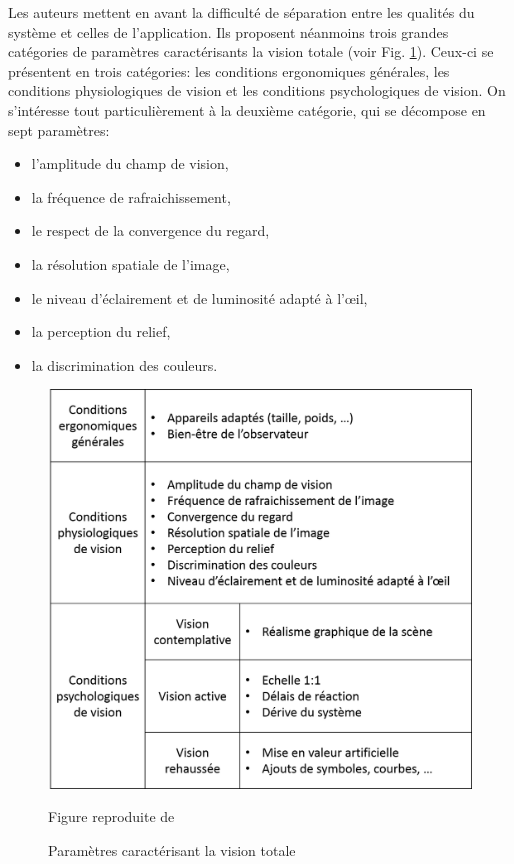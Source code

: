 		\par Les auteurs mettent en avant la difficulté de séparation entre les qualités du système et celles de l'application. Ils proposent néanmoins trois grandes catégories de paramètres caractérisants la vision totale (voir Fig. \ref{fig:burdea_coiffet_tableau}). Ceux-ci se présentent en trois catégories: les conditions ergonomiques générales, les conditions physiologiques de vision et les conditions psychologiques de vision. On s'intéresse tout particulièrement à la deuxième catégorie, qui se décompose en sept paramètres:
		\begin{itemize}
			\item l'amplitude du champ de vision,
			\item la fréquence de rafraichissement,
			\item le respect de la convergence du regard,
			\item la résolution spatiale de l'image,
			\item le niveau d'éclairement et de luminosité adapté à l'œil,
			\item la perception du relief,
			\item la discrimination des couleurs.
		\end{itemize}
		
	\begin{figure}
		\centering
		\includegraphics[scale=.75]{Figures/BurdeaCoiffetTableau}
		\caption{Paramètres caractérisant la vision totale}{Figure reproduite de \citep{burdea_realite_1993}}
		\label{fig:burdea_coiffet_tableau}
	\end{figure}
	
